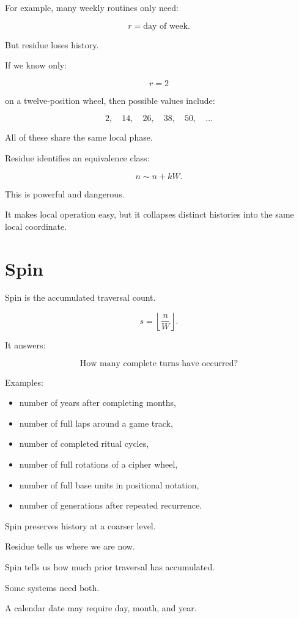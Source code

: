 \documentclass[11pt]{book}
\begin{document}
For example, many weekly routines only need:

\[
r = \text{day of week}.
\]

But residue loses history.

If we know only:

\[
r=2
\]

on a twelve-position wheel, then possible values include:

\[
2,\quad 14,\quad 26,\quad 38,\quad 50,\quad \ldots
\]

All of these share the same local phase.

Residue identifies an equivalence class:

\[
n \sim n + kW.
\]

This is powerful and dangerous.

It makes local operation easy, but it collapses distinct histories into the same local coordinate.

\section{Spin}

Spin is the accumulated traversal count.

\[
s = \left\lfloor \frac{n}{W} \right\rfloor.
\]

It answers:

\[
\text{How many complete turns have occurred?}
\]

Examples:

\begin{itemize}
    \item number of years after completing months,
    \item number of full laps around a game track,
    \item number of completed ritual cycles,
    \item number of full rotations of a cipher wheel,
    \item number of full base units in positional notation,
    \item number of generations after repeated recurrence.
\end{itemize}

Spin preserves history at a coarser level.

Residue tells us where we are now.

Spin tells us how much prior traversal has accumulated.

Some systems need both.

A calendar date may require day, month, and year.
\end{document}
